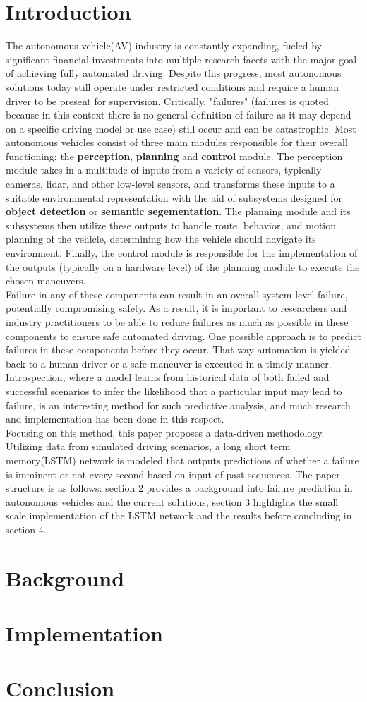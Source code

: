 \documentclass[conference]{IEEEtran}
\begin{document}
\section{Introduction}
The autonomous vehicle(AV) industry is constantly expanding, fueled by significant financial investments into multiple research facets with the major goal of achieving fully automated driving. Despite this progress, most autonomous solutions today still operate under restricted conditions and require a human driver to be present for supervision.  Critically, "failures" (failures is quoted because in this context there is no general definition of failure as it may depend on a specific driving model or use case) still occur and can be catastrophic. 
Most autonomous vehicles consist of three main modules responsible for their overall functioning; the \textbf{perception}, \textbf{planning} and \textbf{control} module. The perception module takes in a multitude of inputs from a variety of sensors, typically cameras, lidar, and other low-level sensors, and transforms these inputs to a suitable environmental representation with the aid of subsystems designed for \textbf{object detection} or \textbf{semantic segementation}. The planning module and its subsystems then utilize these outputs to handle route, behavior, and motion planning of the vehicle, determining how the vehicle should navigate its environment. Finally, the control module is responsible for the implementation of the outputs (typically on a hardware level) of the planning module to execute the chosen maneuvers.\\
Failure in any of these components can result in an overall system-level failure, potentially compromising safety. As a result, it is important to researchers and industry practitioners to be able to reduce failures as much as possible in these components to ensure safe automated driving. One possible approach is to predict failures in these components before they occur. That way automation is yielded back to a human driver or a safe maneuver is executed in a timely manner.\\
Introspection, where a model learns from historical data of both failed and successful scenarios to infer the likelihood that a particular input may lead to failure, is an interesting method for such predictive analysis, and much research and implementation has been done in this respect\cite{kuhn2020, kuhn2022}.\\
Focusing on this method, this paper proposes a data-driven methodology. Utilizing data from simulated driving scenarios, a long short term memory(LSTM) network is modeled that outputs predictions of whether a failure is imminent or not every second based on input of past sequences. The paper structure is as follows: section 2 provides a background into failure prediction in autonomous vehicles and the current solutions, section 3 highlights the small scale implementation of the LSTM network and the results before concluding in section 4.
\section{Background}
\section{Implementation}
\section{Conclusion}
\printbibliography
\end{document}
